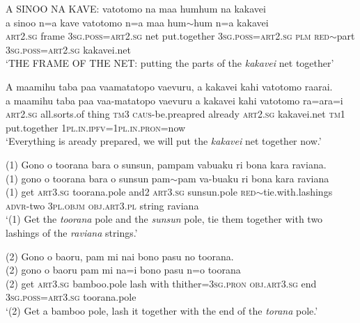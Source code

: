 \ea\label{ex:text22-61}
A SINOO NA KAVE: vatotomo na maa humhum na kakavei\\
\gll a	sinoo	n=a	kave	vatotomo	n=a	maa	hum{$\sim$}hum	n=a	kakavei\\
     \textsc{art}2.\textsc{sg}	frame	3\textsc{sg}.\textsc{poss}=\textsc{art}2.\textsc{sg}	net	put.together	3\textsc{sg}.\textsc{poss}=\textsc{art}2.\textsc{sg}	\textsc{plm}	\textsc{red}{$\sim$}part	3\textsc{sg}.\textsc{poss}=\textsc{art}2.\textsc{sg}	kakavei.net\\
\glt `THE FRAME OF THE NET: putting the parts of the \textit{kakavei} net together'
\z

\ea\label{ex:text22-62}
A maamihu taba paa vaamatatopo vaevuru, a kakavei kahi vatotomo raarai.\\
\gll a	maamihu	taba	paa	vaa-matatopo	vaevuru	a	kakavei	kahi	vatotomo	ra=ara=i\\
     \textsc{art}2.\textsc{sg}	all.sorts.of	thing	\textsc{tm}3	\textsc{caus}-be.preapred	already	\textsc{art}2.\textsc{sg}	kakavei.net	\textsc{tm}1	put.together	1\textsc{pl}.\textsc{in}.\textsc{ipfv}=1\textsc{pl}.\textsc{in}.\textsc{pron}=now\\
\glt `Everything is aready prepared, we will put the \textit{kakavei} net together now.'
\z

\newpage
\ea\label{ex:text22-63}
(1) Gono o toorana bara o sunsun, pampam vabuaku ri bona kara raviana.\\
\gll (1)	gono	o	toorana	bara	o	sunsun	pam{$\sim$}pam	va-buaku	ri	bona	kara	raviana\\
     (1)	get	\textsc{art}3.\textsc{sg}	toorana.pole	and2	\textsc{art}3.\textsc{sg}	sunsun.pole	\textsc{red}{$\sim$}tie.with.lashings	\textsc{advr}-two	3\textsc{pl}.\textsc{objm}	\textsc{obj}.\textsc{art}3.\textsc{pl}	string	raviana\\
\glt `(1) Get the \textit{toorana} pole and the \textit{sunsun} pole, tie them together with two lashings of the \textit{raviana} strings.'
\z

\ea\label{ex:text22-64}
(2) Gono o baoru, pam mi nai bono pasu no toorana.\\
\gll (2)	gono	o	baoru	pam	mi	na=i	bono	pasu	n=o	toorana\\
     (2)	get	\textsc{art}3.\textsc{sg}	bamboo.pole	lash	with	thither=3\textsc{sg}.\textsc{pron}	\textsc{obj}.\textsc{art}3.\textsc{sg}	end	3\textsc{sg}.\textsc{poss}=\textsc{art}3.\textsc{sg}	toorana.pole\\
\glt `(2) Get a bamboo pole, lash it together with the end of the \textit{torana} pole.'
\z

